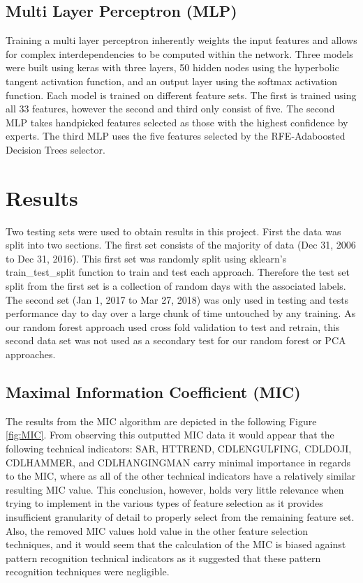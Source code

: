 \documentclass{article}\raggedbottom
\begin{document}
\subsection{Multi Layer Perceptron (MLP)}
Training a multi layer perceptron inherently weights the input features and allows for complex interdependencies to be computed within the network. Three models were built using keras with three layers, 50 hidden nodes using the hyperbolic tangent activation function, and an output layer using the softmax activation function. Each model is trained on different feature sets. The first is trained using all 33 features, however the second and third only consist of five. The second MLP takes handpicked features selected as those with the highest confidence by experts. The third MLP uses the five features selected by the RFE-Adaboosted Decision Trees selector.

\section{Results}
Two testing sets were used to obtain results in this project. First the data was split into two sections. The first set consists of the majority of data (Dec 31, 2006 to Dec 31, 2016). This first set was randomly split using sklearn's train\_test\_split function to train and test each approach. Therefore the test set split from the first set is a collection of random days with the associated labels. The second set (Jan 1, 2017 to Mar 27, 2018) was only used in testing and tests performance day to day over a large chunk of time untouched by any training. As our random forest approach used cross fold validation to test and retrain, this second data set was not used as a secondary test for our random forest or PCA approaches.

\subsection{Maximal Information Coefficient (MIC)}
The results from the MIC algorithm are depicted in the following Figure \ref{fig:MIC}. From observing this outputted MIC data it would appear that the following technical indicators: SAR, HT\textunderscore TREND, CDLENGULFING, CDLDOJI, CDLHAMMER, and CDLHANGINGMAN carry minimal importance in regards to the MIC, where as all of the other technical indicators have a relatively similar resulting MIC value. This conclusion, however, holds very little relevance when trying to implement in the various types of feature selection as it provides insufficient granularity of detail to properly select from the remaining feature set. Also, the removed MIC values hold value in the other feature selection techniques, and it would seem that the calculation of the MIC is biased against pattern recognition technical indicators as it suggested that these pattern recognition techniques were negligible.
\end{document}
